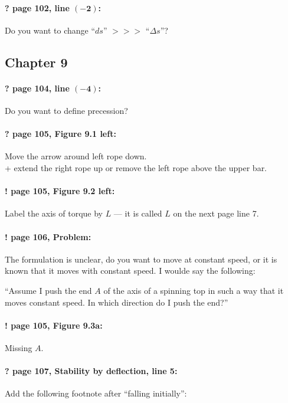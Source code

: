 \documentclass[twoside]{article}
\begin{document}
\paragraph{? page 102, line $\bm{(-2)}$:} Do you want to change ``$ds$'' $>\!>\!>$ ``$\Delta s$''?

\subsection*{Chapter 9}

\paragraph{? page 104, line $\bm{(-4)}$:} Do you want to define precession?

\paragraph{? page 105, Figure 9.1 left:} Move the arrow around left rope down.
\\ + extend the right rope up or remove the left rope above the upper bar.

\paragraph{! page 105, Figure 9.2 left:} Label the axis of torque by $L$ --- it is called $L$ on the next page line 7.

\paragraph{! page 106, Problem:} The formulation is unclear, do you want to move at constant speed, or it is known that it moves with constant speed. I woulde say the following:

``Assume I push the end $A$ of the axis of a spinning top in such a way that it moves  constant speed. In which direction do I push the end?''

\paragraph{! page 105, Figure 9.3a:} Missing $A$.

\paragraph{? page 107, Stability by deflection, line 5:} Add the following footnote after ``falling initially'':
\end{document}
